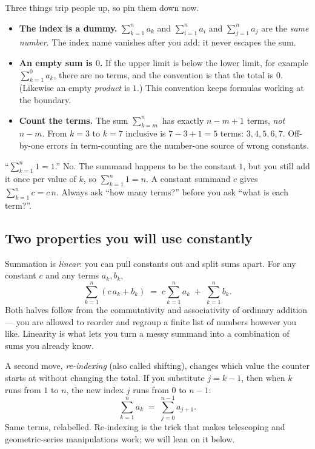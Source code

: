 Three things trip people up, so pin them down now.

\begin{itemize}
  \item \textbf{The index is a dummy.} $\sum_{k=1}^{n} a_k$ and
        $\sum_{i=1}^{n} a_i$ and $\sum_{j=1}^{n} a_j$ are the \emph{same number}.
        The index name vanishes after you add; it never escapes the sum.
  \item \textbf{An empty sum is $0$.} If the upper limit is below the lower limit,
        for example $\sum_{k=1}^{0} a_k$, there are no terms, and the convention is
        that the total is $0$. (Likewise an empty \emph{product} is $1$.) This
        convention keeps formulas working at the boundary.
  \item \textbf{Count the terms.} The sum $\sum_{k=m}^{n}$ has exactly
        $n - m + 1$ terms, \emph{not} $n - m$. From $k=3$ to $k=7$ inclusive is
        $7 - 3 + 1 = 5$ terms: $3,4,5,6,7$. Off-by-one errors in term-counting are
        the number-one source of wrong constants.
\end{itemize}

\begin{trapbox}
``$\sum_{k=1}^{n} 1 = 1$.'' No. The summand happens to be the constant $1$, but
you still add it once per value of $k$, so $\sum_{k=1}^{n} 1 = n$. A constant
summand $c$ gives $\sum_{k=1}^{n} c = c\,n$. Always ask ``how many terms?''
before you ask ``what is each term?''.
\end{trapbox}

\subsection{Two properties you will use constantly}
\label{ch37:linearity}

Summation is \emph{linear}: you can pull constants out and split sums apart. For
any constant $c$ and any terms $a_k, b_k$,
\[
  \sum_{k=1}^{n} (c\,a_k + b_k)
    \;=\; c\sum_{k=1}^{n} a_k \;+\; \sum_{k=1}^{n} b_k .
\]
Both halves follow from the commutativity and
associativity of ordinary addition --- you are allowed to reorder and regroup a
finite list of numbers however you like. Linearity is what lets you turn a messy
summand into a combination of sums you already know.

A second move, \emph{re-indexing} (also called shifting), changes which value the
counter starts at without changing the total. If you substitute $j = k - 1$, then
when $k$ runs from $1$ to $n$, the new index $j$ runs from $0$ to $n-1$:
\[
  \sum_{k=1}^{n} a_k \;=\; \sum_{j=0}^{n-1} a_{j+1}.
\]
Same terms, relabelled. Re-indexing is the trick that makes telescoping and
geometric-series manipulations work; we will lean on it below.

